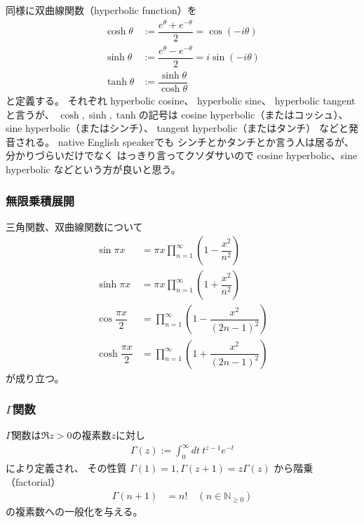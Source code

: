 同様に双曲線関数（hyperbolic function）を
\begin{subequations}
\begin{align}
    \cosh\theta
    &:=
    \dfrac{e^{\theta} + e^{-\theta}}{2}
    =
    \cos(-i\theta)
\\
    \sinh\theta
    &:=
    \dfrac{e^{\theta} - e^{-\theta}}{2}
    =
    i\sin(-i\theta)
\\
    \tanh\theta
    &:=
    \dfrac{\sinh\theta}{\cosh\theta}
\end{align}
\end{subequations}
と定義する。
それぞれ
hyperbolic cosine、
hyperbolic sine、
hyperbolic tangentと言うが、
$\cosh, \sinh, \tanh$の記号は
cosine hyperbolic（またはコッシュ）、
sine hyperbolic（またはシンチ）、
tangent hyperbolic（またはタンチ）
などと発音される。
native English speakerでも
シンチとかタンチとか言う人は居るが、
分かりづらいだけでなく
はっきり言ってクソダサいので
cosine hyperbolic、sine hyperbolic
などという方が良いと思う。

\subsubsection{無限乗積展開}

三角関数、双曲線関数について
\begin{subequations}
\begin{align}
    \sin \pi x
    &=
    \pi x
    \prod_{n=1}^\infty
    \left(
        1 - \dfrac{x^2}{n^2}
    \right)
\label{infinite product of sine}
\\
    \sinh \pi x
    &=
    \pi x
    \prod_{n=1}^\infty
    \left(
        1 + \dfrac{x^2}{n^2}
    \right)
\label{infinite product of sine hyperbolic}
\\
    \cos \dfrac{\pi x}{2}
    &=
    \prod_{n=1}^\infty
    \left(
        1 - \dfrac{x^2}{(2n-1)^2}
    \right)
\\
    \cosh \dfrac{\pi x}{2}
    &=
    \prod_{n=1}^\infty
    \left(
        1 + \dfrac{x^2}{(2n-1)^2}
    \right)
\end{align}
\end{subequations}
が成り立つ。

\subsubsection{$\Gamma$関数}

$\Gamma$関数は$\Re z > 0$の複素数$z$に対し
\begin{align}
    \Gamma(z)
    := \int_0^\infty dt\ t^{z-1} e^{-t}
\end{align}
により定義され、
その性質
$\Gamma(1) = 1, \Gamma(z+1) = z\Gamma(z)$
から階乗（factorial）
\begin{align}
    \Gamma(n+1) &= n!
    \quad
    (n \in \mathbb{N}_{\ge0})
\end{align}
の複素数への一般化を与える。


